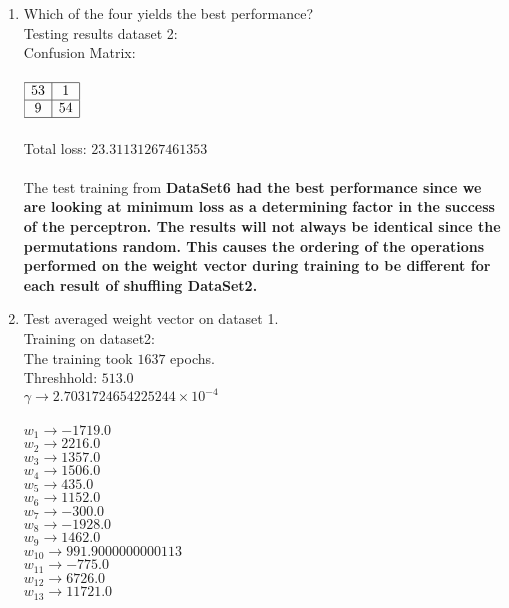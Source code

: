 \begin{enumerate}
\begin{enumerate}
				\item{Which of the four yields the best performance? } \\
					Testing results dataset 2: \\
					\textnormal{Confusion Matrix: } \\ \\
					\( 
						\begin{array}{|c|c|}
							\hline
							53 & 1 \\
							\hline							
							9 & 54 \\
							\hline
						\end{array}
					\) \\ \\
					Total loss: \(23.31131267461353\) \\ \\
					\textnormal{The test training from} \bf{DataSet6} \textnormal{had the best performance since we are looking at minimum loss as a determining factor in the success of the perceptron.  The results will not always be identical since the permutations random.  This causes the ordering of the operations performed on the weight vector during training to be different for each result of shuffling DataSet2.  } \\ 
				\item{Test averaged weight vector on dataset 1.} \\
					Training on dataset2: \\
					\textnormal{The training took } \(1637\) \textnormal{ epochs. } \\
					\textnormal{Threshhold:} \( 513.0 \) \\
					\( \gamma \rightarrow 2.7031724654225244 \times 10^{-4} \) \\ \\
					\( w_{1} \rightarrow -1719.0 \) \\
					\( w_{2} \rightarrow 2216.0 \) \\
					\( w_{3} \rightarrow 1357.0 \) \\
					\( w_{4} \rightarrow 1506.0 \) \\
					\( w_{5} \rightarrow 435.0 \) \\
					\( w_{6} \rightarrow 1152.0 \) \\
					\( w_{7} \rightarrow -300.0 \) \\
					\( w_{8} \rightarrow -1928.0 \) \\
					\( w_{9} \rightarrow 1462.0 \) \\
					\( w_{10} \rightarrow 991.9000000000113 \) \\
					\( w_{11} \rightarrow -775.0 \) \\
					\( w_{12} \rightarrow 6726.0 \) \\
					\( w_{13} \rightarrow 11721.0 \) \\
					

\end{enumerate}
\end{enumerate}
